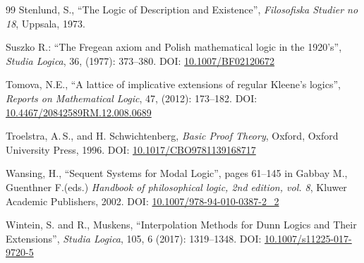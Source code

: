 \documentclass[11pt,a4paper,titlepage]{article}
\theoremstyle{definition}
\newcommand{\3}{\vspace{.3in}}
\newcommand{\2}{\vspace{.2in}}
\newcommand{\1}{\vspace{.1in}}
\newcommand{\5}{\vspace{.05in}}
\newcommand\DOI[2]{DOI: \href{#1#2}{#2}}
\newcommand{\ts}{\,}
\begin{document}
\begin{thebibliography}{99}
Stenlund, S., ``The Logic of Description and Existence'', \textit{Filosofiska Studier no 18}, Uppsala, 1973.

Suszko R.:  ``The Fregean axiom and Polish mathematical logic in the 1920's'', \textit{Studia Logica}, 36, (1977): 373--380.
\DOI{http://dx.doi.org/}{10.1007/BF02120672}

Tomova, N.E.,  ``A lattice of implicative extensions of regular Kleene's logics'',  \textit{Reports on Mathematical Logic}, 47,  (2012): 173--182.
\DOI{http://dx.doi.org/}{10.4467/20842589RM.12.008.0689}

Troelstra, A.\ts S., and H. Schwichtenberg, \textit{Basic Proof Theory}, Oxford, 
Oxford University Press, 1996.
\DOI{http://dx.doi.org/}{10.1017/CBO9781139168717}

Wansing, H., ``Sequent Systems for Modal Logic'', pages 61--145 in Gabbay M., Guenthner F.(eds.) \textit{Handbook of philosophical logic, 2nd edition, vol. 8}, Kluwer Academic Publishers, 2002. 
\DOI{http://dx.doi.org/}{10.1007/978-94-010-0387-2\_2}

Wintein, S. and R., Muskens, ``Interpolation Methods for Dunn Logics and Their Extensions'',  \textit{Studia Logica}, 105, 6 (2017): 1319--1348.
\DOI{http://dx.doi.org/}{10.1007/s11225-017-9720-5}
\end{thebibliography}
\end{document}
